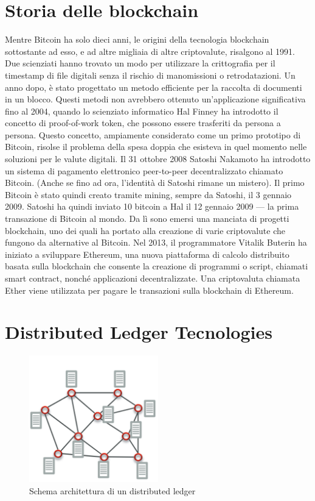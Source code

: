 \section{Storia delle blockchain}
Mentre Bitcoin ha solo dieci anni, le origini della tecnologia blockchain sottostante ad esso, e ad altre migliaia di altre criptovalute, risalgono al 1991. Due scienziati hanno trovato un modo per utilizzare la crittografia per il timestamp di file digitali senza il rischio di manomissioni o retrodatazioni. Un anno dopo, è stato progettato un metodo efficiente per la raccolta di documenti in un blocco.
Questi metodi non avrebbero ottenuto un’applicazione significativa fino al 2004, quando lo scienziato informatico Hal Finney ha introdotto il concetto di proof-of-work token, che possono essere trasferiti da persona a persona. Questo concetto, ampiamente considerato come un primo prototipo di Bitcoin, risolse il problema della spesa doppia che esisteva in quel momento nelle soluzioni per le valute digitali.
Il 31 ottobre 2008 Satoshi Nakamoto ha introdotto un sistema di pagamento elettronico peer-to-peer decentralizzato chiamato Bitcoin. (Anche se fino ad ora, l’identità di Satoshi rimane un mistero). Il primo Bitcoin è stato quindi creato tramite mining, sempre da Satoshi, il 3 gennaio 2009. Satoshi ha quindi inviato 10 bitcoin a Hal il 12 gennaio 2009 — la prima transazione di Bitcoin al mondo.
Da lì sono emersi una manciata di progetti blockchain, uno dei quali ha portato alla creazione di varie criptovalute che fungono da alternative al Bitcoin. Nel 2013, il programmatore Vitalik Buterin ha iniziato a sviluppare Ethereum, una nuova piattaforma di calcolo distribuito basata sulla blockchain che consente la creazione di programmi o script, chiamati smart contract, nonché applicazioni decentralizzate. Una criptovaluta chiamata Ether viene utilizzata per pagare le transazioni sulla blockchain di Ethereum.
\newpage
\section{Distributed Ledger Tecnologies}
\begin{figure}[h]
    \centering
    \includegraphics[width=0.5\textwidth]{img/dlt.png}
    \caption{Schema architettura di un distributed ledger}
    \label{fig:dlt}
\end{figure}

